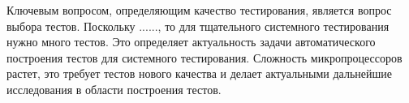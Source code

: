 Ключевым вопросом, определяющим качество тестирования, является вопрос выбора тестов. Поскольку ......, то для тщательного системного тестирования нужно много тестов. Это определяет актуальность задачи автоматического построения тестов для системного тестирования. Сложность микропроцессоров растет, это требует тестов нового качества и делает актуальными дальнейшие исследования в области построения тестов.






